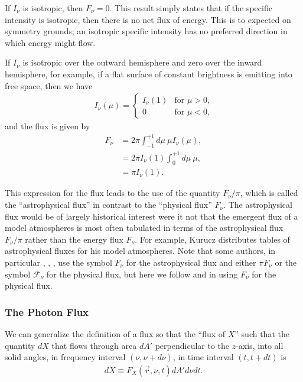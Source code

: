 \newslide

If $I_\nu$ is isotropic, then $F_\nu = 0$. This result simply states
that if the specific intensity is isotropic, then there is no net flux
of energy. This is to expected on symmetry grounds; an isotropic
specific intensity has no preferred direction in which energy might flow.

\newslide

If $I_\nu$ is isotropic over the outward hemisphere and zero
over the inward hemisphere, for example, if a flat surface
of constant brightness is emitting into free space, then we
have
\begin{align}
I_\nu(\mu) =
\begin{cases}
I_\nu(1)&\mbox{for $\mu>0$,}\\
0&\mbox{for $\mu<0$,}
\end{cases}
\end{align}
and the flux is given by 
\begin{align}
\label{eq-flux-from-surface}
F_\nu &= 2\pi\int_{-1}^{+1}\!\!\!d\mu\:\mu I_\nu(\mu),\\
      &= 2\pi I_\nu(1)\int_{0}^{+1}\!\!\!d\mu\:\mu,\\
      &= \pi I_\nu(1).
\end{align}

This expression for the flux leads to the use of the quantity
$F_\nu/\pi$, which is called the ``astrophysical flux'' in contrast to
the ``physical flux'' $F_\nu$. The astrophysical flux would be of
largely historical interest were it not that the emergent flux of a
model atmospheres is most often tabulated in terms of the astrophysical
flux $F_\nu/\pi$ rather than the energy flux $F_\nu$. For example,
Kurucz distributes tables of astrophysical fluxes for his model
atmospheres. Note that some authors, in particular
\cite{Chandrasekhar-1960}, \cite{Mihalas-1978}, \cite{Gray-1992}, use
the symbol $F_\nu$ for the astrophysical flux and either $\pi F_\nu$ or
the symbol $\mathcal{F}_\nu$ for the physical flux, but here we follow
\cite{Milne-1930} and \cite{Rybicki-1979} in using $F_\nu$ for the
physical flux.

\newslide

\subsubsection{The Photon Flux}

We can generalize the definition of a flux so that the ``flux of $X$'' such that the quantity $dX$ that flows through area
$dA'$ perpendicular to the $z$-axis, into all solid angles, in frequency interval $(\nu,\nu+d\nu)$, in
time interval $(t,t+dt)$ is
\begin{align}
dX \equiv F_X(\vec r, \nu, t) dA' d\nu dt.
\end{align}

